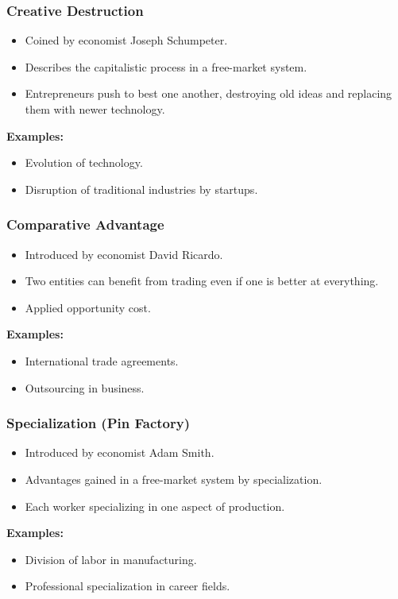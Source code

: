 \begin{frame}[fragile]\frametitle{Creative Destruction}
\begin{itemize}
    \item Coined by economist Joseph Schumpeter.
    \item Describes the capitalistic process in a free-market system.
    \item Entrepreneurs push to best one another, destroying old ideas and replacing them with newer technology.
\end{itemize}
\textbf{Examples:}
\begin{itemize}
    \item Evolution of technology.
    \item Disruption of traditional industries by startups.
\end{itemize}
\end{frame}

\begin{frame}[fragile]\frametitle{Comparative Advantage}
\begin{itemize}
    \item Introduced by economist David Ricardo.
    \item Two entities can benefit from trading even if one is better at everything.
    \item Applied opportunity cost.
\end{itemize}
\textbf{Examples:}
\begin{itemize}
    \item International trade agreements.
    \item Outsourcing in business.
\end{itemize}
\end{frame}

\begin{frame}[fragile]\frametitle{Specialization (Pin Factory)}
\begin{itemize}
    \item Introduced by economist Adam Smith.
    \item Advantages gained in a free-market system by specialization.
    \item Each worker specializing in one aspect of production.
\end{itemize}
\textbf{Examples:}
\begin{itemize}
    \item Division of labor in manufacturing.
    \item Professional specialization in career fields.
\end{itemize}
\end{frame}


